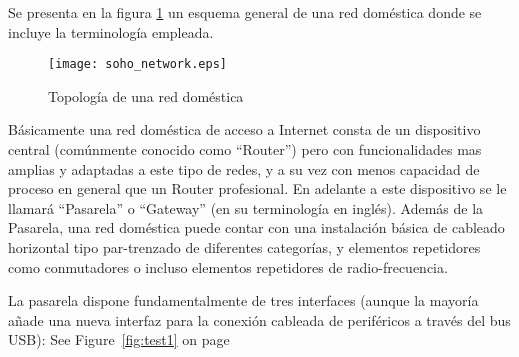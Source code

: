 \label{sec:obj}
    Se presenta en la figura \ref{fig:red_soho} un esquema general de una red doméstica donde se incluye la terminología empleada.

    \begin{figure}[h!]
    \centering
        \texttt{[image: soho\_network.eps]}
        \caption{Topología de una red doméstica}
        \label{fig:red_soho}
    \end{figure}

    Básicamente una red doméstica de acceso a Internet consta de un dispositivo central (comúnmente conocido como ``Router'') pero con funcionalidades mas amplias y adaptadas a este tipo de redes, y a su vez con menos capacidad de proceso en general que un Router profesional. En adelante a este dispositivo se le llamará ``Pasarela'' o ``Gateway'' (en su terminología en inglés). Además de la Pasarela, una red doméstica puede contar con una instalación básica de cableado horizontal tipo par-trenzado de diferentes categorías, y elementos repetidores como conmutadores o incluso elementos repetidores de radio-frecuencia.

    La pasarela dispone fundamentalmente de tres interfaces (aunque la mayoría añade una nueva interfaz para la conexión cableada de periféricos a través del bus USB): 
    See Figure~\ref{fig:test1} on page~\pageref{fig:test1}

